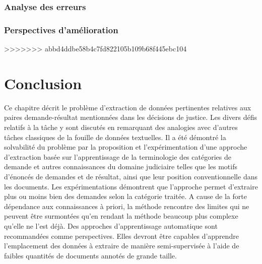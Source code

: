 \subsubsection{Analyse des erreurs}
\subsubsection{Perspectives d'amélioration}
>>>>>>> abbd4ddbe58b4c7fd822105b109b68f445ebc104

\section{Conclusion}
\label{sec:quanta:conclusion}
Ce chapitre décrit le problème d'extraction de données pertinentes relatives aux paires demande-résultat mentionnées dans les décisions de justice. Les divers défis relatifs à la tâche  y sont discutés en remarquant des analogies avec d'autres tâches classiques de la fouille de données textuelles. Il a été démontré la solvabilité du problème par la proposition et l'expérimentation d'une approche d'extraction basée sur l'apprentissage de la terminologie des catégories de demande et autres connaissances du domaine judiciaire telles que les motifs d'énoncés de demandes et de résultat, ainsi que leur position conventionnelle dans les documents.  Les expérimentations démontrent que l'approche permet d'extraire plus ou moins bien des demandes selon la catégorie traitée. A cause de la  forte dépendance aux connaissances à priori, la méthode rencontre des limites qui ne peuvent être surmontées qu'en rendant la méthode beaucoup plus complexe qu'elle ne l'est déjà. Des approches d'apprentissage automatique sont recommandées comme perspectives. Elles devront être capables d'apprendre l'emplacement des données à extraire de manière semi-supervisée à l'aide de faibles quantités de documents annotés de grande taille.
